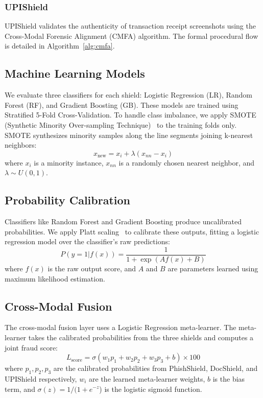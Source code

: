 \documentclass[journal]{IEEEtran}
\begin{document}
\subsubsection{UPIShield}
UPIShield validates the authenticity of transaction receipt screenshots using the Cross-Modal Forensic Alignment (CMFA) algorithm. The formal procedural flow is detailed in Algorithm~\ref{alg:cmfa}.





\subsection{Machine Learning Models}
We evaluate three classifiers for each shield: Logistic Regression (LR), Random Forest (RF), and Gradient Boosting (GB). These models are trained using Stratified 5-Fold Cross-Validation. To handle class imbalance, we apply SMOTE (Synthetic Minority Over-sampling Technique)~\cite{smote} to the training folds only. SMOTE synthesizes minority samples along the line segments joining k-nearest neighbors:
\begin{equation}
x_{\text{new}} = x_i + \lambda (x_{nn} - x_i)
\end{equation}
where $x_i$ is a minority instance, $x_{nn}$ is a randomly chosen nearest neighbor, and $\lambda \sim U(0, 1)$.

\subsection{Probability Calibration}
Classifiers like Random Forest and Gradient Boosting produce uncalibrated probabilities. We apply Platt scaling~\cite{delong} to calibrate these outputs, fitting a logistic regression model over the classifier's raw predictions:
\begin{equation}
P(y=1 | f(x)) = \frac{1}{1 + \exp(A f(x) + B)}
\end{equation}
where $f(x)$ is the raw output score, and $A$ and $B$ are parameters learned using maximum likelihood estimation.

\subsection{Cross-Modal Fusion}
The cross-modal fusion layer uses a Logistic Regression meta-learner. The meta-learner takes the calibrated probabilities from the three shields and computes a joint fraud score:
\begin{equation}
L_{\text{score}} = \sigma(w_1 p_1 + w_2 p_2 + w_3 p_3 + b) \times 100
\end{equation}
where $p_1, p_2, p_3$ are the calibrated probabilities from PhishShield, DocShield, and UPIShield respectively, $w_i$ are the learned meta-learner weights, $b$ is the bias term, and $\sigma(z) = 1 / (1 + e^{-z}$) is the logistic sigmoid function.
\end{document}
